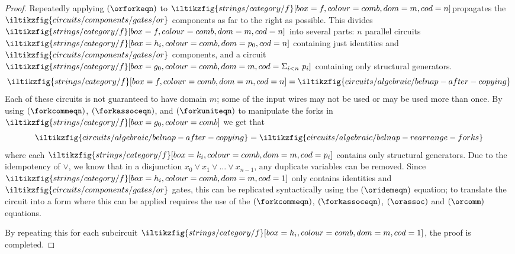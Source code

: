 \begin{proof}
    Repeatedly applying \((\orforkeqn)\) to \(
    \iltikzfig{strings/category/f}[box=f,colour=comb,dom=m,cod=n]
    \)propagates the \(
    \iltikzfig{circuits/components/gates/or}
    \) components as far to the right
    as possible.
    This divides \(
    \iltikzfig{strings/category/f}[box=f,colour=comb,dom=m,cod=n]
    \) into several parts: \(n\) parallel circuits \(
    \iltikzfig{strings/category/f}[box=h_i,colour=comb,dom=p_0,cod=n]
    \) containing just identities and \(
    \iltikzfig{circuits/components/gates/or}
    \) components, and a circuit \(
    \iltikzfig{strings/category/f}[box=g_0,colour=comb,dom=m,cod={\Sigma_{i<n}\ p_i}]
    \) containing only structural generators.
    \[
        \iltikzfig{strings/category/f}[box=f,colour=comb,dom=m,cod=n]
        =
        \iltikzfig{circuits/algebraic/belnap-after-copying}
    \]
    Each of these circuits is not guaranteed to have domain \(m\); some of the
    input wires may not be used or may be used more than once.
    By using \((\forkcommeqn)\), \((\forkassoceqn)\), and \((\forkuniteqn)\) to
    manipulate the forks in \(
    \iltikzfig{strings/category/f}[box=g_0,colour=comb]
    \)
    we get that \[
        \iltikzfig{circuits/algebraic/belnap-after-copying}
        =
        \iltikzfig{circuits/algebraic/belnap-rearrange-forks}
    \] where each \(
    \iltikzfig{strings/category/f}[box=k_i,colour=comb,dom=m,cod=p_i]
    \) contains only structural generators.
    Due to the idempotency of \(\lor\), we know that in a disjunction
    \(x_0 \lor x_1 \lor \dots \lor x_{n-1}\), any duplicate variables can
    be removed.
    Since \(
    \iltikzfig{strings/category/f}[box=h_i,colour=comb,dom=m,cod=1]
    \) only contains identities and \(
    \iltikzfig{circuits/components/gates/or}
    \) gates, this can be replicated syntactically
    using the \((\oridemeqn)\) equation; to translate the circuit into a form
    where this can be applied requires the use of the \((\forkcommeqn)\),
    \((\forkassoceqn)\), \((\orassoc)\) and \((\orcomm)\) equations.

    By repeating this for each subcircuit \(
    \iltikzfig{strings/category/f}[box=h_i,colour=comb,dom=m,cod=1]
    \), the proof is completed.
\end{proof}

\begin{example}
\end{example}


